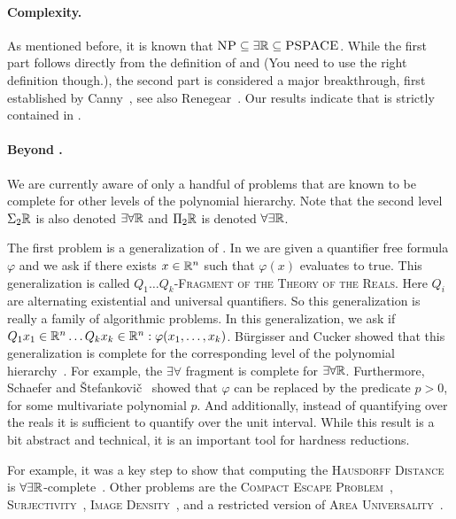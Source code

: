 \documentclass{article}
\begin{document}
\paragraph{Complexity.}
As mentioned before, it is known that $\textsc{NP} \subseteq \exists\mathbb{R} \subseteq \textsc{PSPACE}$. 
While the first part follows directly from the definition of \NP and \ER (You need to use the right definition though.), the second part is considered a major breakthrough, first established by Canny~\cite{C88b}, see also Renegear~\cite{R92}.
Our results indicate that \ER is strictly contained in \PSPACE.

\paragraph{Beyond \ER.}
We are currently aware of only a handful of problems that are known to be complete for other levels of the polynomial hierarchy. 
Note that the second level $\Sigma_{2}\mathbb{R}$ is also denoted $\exists \forall \mathbb{R}$ and $\Pi_{2}\mathbb{R}$ is denoted $\forall \exists \mathbb{R}$.

The first problem is a generalization of \ETR.
In \ETR we are given a quantifier free formula $\varphi$
and we ask if there exists $x\in\mathbb{R}^n$ such that $\varphi(x)$ evaluates to true.
This generalization is called $Q_1\ldots Q_k$-\textsc{Fragment of the Theory of the Reals}.
Here $Q_i$ are alternating existential and universal quantifiers.
So this generalization is really a family of algorithmic problems.
In this generalization, we ask if
$Q_1 x_1\in \mathbb{R}^n \ldots Q_k x_k\in \mathbb{R}^n : \varphi(x_1,\ldots,x_k)$.
B\"{u}rgisser and Cucker showed that this generalization is complete for the corresponding level of the   polynomial hierarchy~\cite{BC09}. For example, the $\exists \forall$ fragment is complete for $\exists \forall \mathbb{R}$.
Furthermore, Schaefer and \v{S}tefankovi\v{c}~\cite{SS22}
showed that $\varphi$ can be replaced by the predicate $p>0$, for some multivariate polynomial $p$.
And additionally, instead of quantifying over the reals it is sufficient to quantify over the unit interval.
While this result is a bit abstract and technical, it is an important tool for hardness reductions.

For example, it was a key step to show that computing the \textsc{Hausdorff Distance} is $\forall \exists \mathbb{R}$-complete~\cite{JKM23}.
Other problems are the \textsc{Compact Escape Problem}~\cite{DCLNOW21}, \textsc{Surjectivity}~\cite{SS23, BC09}, \textsc{Image Density}~\cite{BC09, JJ23}, and a restricted version of \textsc{Area Universality}~\cite{DKMR18}.
\end{document}
